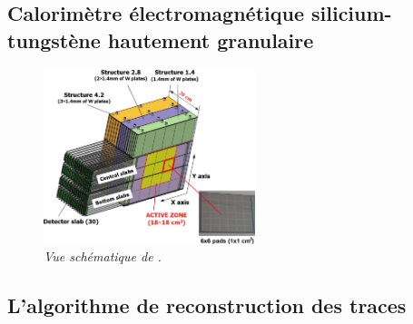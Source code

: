 \subsection*{Calorim\`etre \'electromagn\'etique silicium-tungst\`ene hautement granulaire}

\begin{figure}[H]
	\centering
	\includegraphics[width=0.55\textwidth]{ECAL/graphics/ecal-new.png}
	\caption{\label{fig:ECAL-schemeF} \sl  Vue sch\'ematique de \ecal.}
\end{figure}

\subsection*{L'algorithme de reconstruction des traces}

